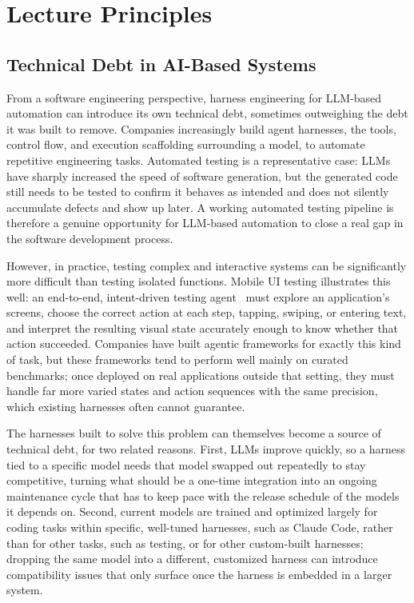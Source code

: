 \documentclass[11pt]{article}
\begin{document}
\section{Lecture Principles}

\subsection{Technical Debt in AI-Based Systems}

From a software engineering perspective, harness engineering for LLM-based automation can introduce its own technical debt, sometimes outweighing the debt it was built to remove. Companies increasingly build agent harnesses, the tools, control flow, and execution scaffolding surrounding a model, to automate repetitive engineering tasks. Automated testing is a representative case: LLMs have sharply increased the speed of software generation, but the generated code still needs to be tested to confirm it behaves as intended and does not silently accumulate defects and show up later. A working automated testing pipeline is therefore a genuine opportunity for LLM-based automation to close a real gap in the software development process.

However, in practice, testing complex and interactive systems can be significantly more difficult than testing isolated functions. Mobile UI testing illustrates this well: an end-to-end, intent-driven testing agent~\citep{yoon2024intent} must explore an application's screens, choose the correct action at each step, tapping, swiping, or entering text, and interpret the resulting visual state accurately enough to know whether that action succeeded. Companies have built agentic frameworks for exactly this kind of task, but these frameworks tend to perform well mainly on curated benchmarks; once deployed on real applications outside that setting, they must handle far more varied states and action sequences with the same precision, which existing harnesses often cannot guarantee.

The harnesses built to solve this problem can themselves become a source of technical debt, for two related reasons. First, LLMs improve quickly, so a harness tied to a specific model needs that model swapped out repeatedly to stay competitive, turning what should be a one-time integration into an ongoing maintenance cycle that has to keep pace with the release schedule of the models it depends on. Second, current models are trained and optimized largely for coding tasks within specific, well-tuned harnesses, such as Claude Code, rather than for other tasks, such as testing, or for other custom-built harnesses; dropping the same model into a different, customized harness can introduce compatibility issues that only surface once the harness is embedded in a larger system.
\end{document}

